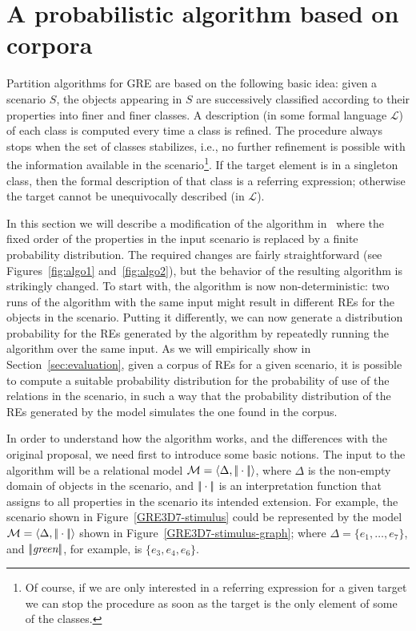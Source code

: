 \section{A probabilistic algorithm based on corpora} \label{sec:algorithm}

Partition algorithms for GRE are based on the following basic idea: given a 
scenario $S$, the objects appearing in $S$ are successively classified according
to their properties into finer and finer classes. A description (in some formal language $\mathcal{L}$) of each 
class is computed every time a class is refined.   The procedure always stops when the 
set of classes stabilizes, i.e., no further refinement is possible with the information 
available in the scenario\footnote{Of course, if we are only interested in a referring expression for 
a given target we can stop the procedure as soon as the target is the only element of some of the classes.}.  If the target element is in a singleton class, then 
the formal description of that class is a referring expression; otherwise the 
target cannot be unequivocally described (in $\mathcal{L}$).  

In this section we will describe a modification of the algorithm in~\cite{arec2:2008:Areces} where the fixed order of the properties in the 
input scenario is replaced by a finite probability distribution.  The required changes
are fairly straightforward (see Figures~\ref{fig:algo1} and~\ref{fig:algo2}), but 
the behavior of the resulting algorithm is strikingly changed. To start with, the 
algorithm is now non-deterministic: two runs of the algorithm with the same 
input might result in different REs for the objects in the scenario.  Putting 
it differently, we can now generate a distribution probability for the REs generated by the algorithm by repeatedly running 
the algorithm over the same input.  As we will empirically show in Section~\ref{sec:evaluation}, given a 
corpus of REs for a given scenario, it is possible to compute a suitable probability 
distribution for the probability of use of the relations in the scenario, in such a way that the probability 
distribution of the REs generated by the model simulates the one found in the corpus.

In order to understand how the algorithm works, and the differences with the original proposal, we need first to introduce some 
basic notions.  The input to the algorithm will be a relational model $\mathcal{M} = \langle \Delta, |\!|\cdot|\!| \rangle$,
where $\Delta$ is the non-empty domain of objects in the scenario, and $|\!|\cdot|\!|$ is an 
interpretation function that assigns to all properties in the scenario its intended extension.  For example, 
the scenario shown in Figure~\ref{GRE3D7-stimulus} could be represented by the model $\mathcal{M}=\langle \Delta,|\!|\cdot|\!| \rangle$ shown in Figure~\ref{GRE3D7-stimulus-graph}; where $\Delta = \{e_1,\ldots,e_7\}$, and $|\!|\emph{green}|\!|$, for example, is $\{e_3,e_4,e_6\}$.

